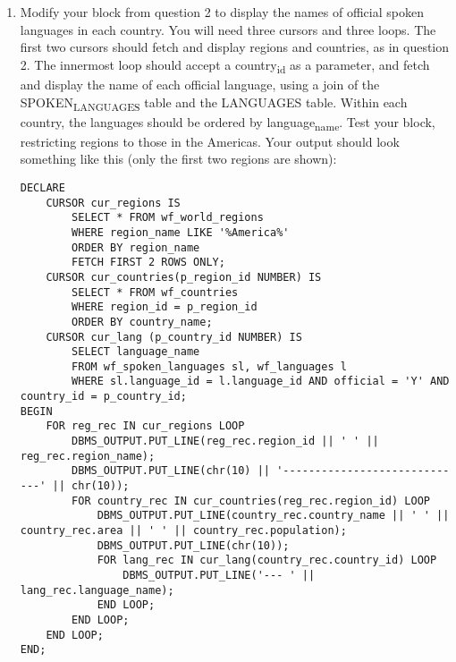 \documentclass[11pt]{article}
\begin{document}
\begin{enumerate}
\item Modify your block from question 2 to display the names of official spoken languages in each country. You will need three cursors and three loops. The first two cursors should fetch and display regions and countries, as in question 2. The innermost loop should accept a country\textsubscript{id} as a parameter, and fetch and display the name of each official language, using a join of the SPOKEN\textsubscript{LANGUAGES} table and the LANGUAGES table. Within each country, the languages should be ordered by language\textsubscript{name}. Test your block, restricting regions to those in the Americas. Your output should look something like this (only the first two regions are shown):
\begin{verbatim}
DECLARE
    CURSOR cur_regions IS
        SELECT * FROM wf_world_regions
        WHERE region_name LIKE '%America%'
        ORDER BY region_name
        FETCH FIRST 2 ROWS ONLY;
    CURSOR cur_countries(p_region_id NUMBER) IS
        SELECT * FROM wf_countries
        WHERE region_id = p_region_id
        ORDER BY country_name;
    CURSOR cur_lang (p_country_id NUMBER) IS
        SELECT language_name
        FROM wf_spoken_languages sl, wf_languages l
        WHERE sl.language_id = l.language_id AND official = 'Y' AND country_id = p_country_id;
BEGIN
    FOR reg_rec IN cur_regions LOOP
        DBMS_OUTPUT.PUT_LINE(reg_rec.region_id || ' ' || reg_rec.region_name);
        DBMS_OUTPUT.PUT_LINE(chr(10) || '-----------------------------' || chr(10));
        FOR country_rec IN cur_countries(reg_rec.region_id) LOOP
            DBMS_OUTPUT.PUT_LINE(country_rec.country_name || ' ' || country_rec.area || ' ' || country_rec.population);
            DBMS_OUTPUT.PUT_LINE(chr(10));
            FOR lang_rec IN cur_lang(country_rec.country_id) LOOP
                DBMS_OUTPUT.PUT_LINE('--- ' || lang_rec.language_name);
            END LOOP;
        END LOOP;
    END LOOP;
END;
\end{verbatim}
\end{enumerate}
\end{document}
